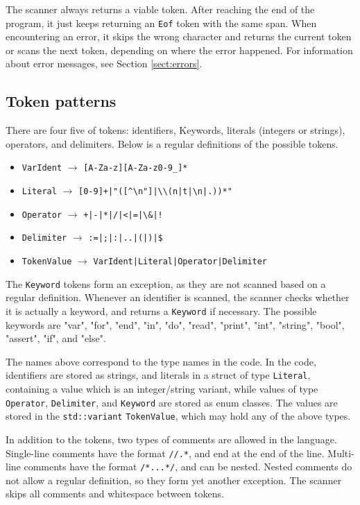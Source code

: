 \documentclass[a4paper]{article}
\newcommand*{\code}[1]{\texttt{#1}}
\begin{document}
The scanner always returns a viable token. After reaching the 
end of the program, it just keeps returning an \code{Eof} token 
with the same span. When encountering an error, it skips the 
wrong character and returns the current token or scans the next token, 
depending on where the error happened. For information about 
error messages, see Section \ref{sect:errors}.


\subsection{Token patterns}

There are four five of tokens: identifiers, Keywords, 
literals (integers or strings), operators, and delimiters.
Below is a regular definitions of the possible tokens. 
\begin{itemize}
  \item[] \code{VarIdent} $\rightarrow$ \verb?[A-Za-z][A-Za-z0-9_]*?
  \item[] \code{Literal} $\rightarrow$ \verb_[0-9]+|"([^\n"]|\\(n|t|\n|.))*"_
  \item[] \code{Operator} $\rightarrow$ \verb_+|-|*|/|<|=|\&|!_
  \item[] \code{Delimiter} $\rightarrow$ \verb_:=|;|:|..|(|)|$_
  \item[] \code{TokenValue} $\rightarrow$ \verb_VarIdent|Literal|Operator|Delimiter_
\end{itemize}
The \code{Keyword} tokens form an exception, as they are not scanned 
based on a regular definition. Whenever an identifier is scanned, 
the scanner checks whether it is actually a keyword, and returns 
a \code{Keyword} if necessary.
The possible keywords are  "var", "for", "end", "in", "do", "read", "print", 
"int", "string", "bool", "assert", "if", and "else".

The names above correspond to the type names in the code.  
In the code, identifiers are stored as strings, and literals in a 
struct of type \code{Literal}, containing a value which is 
an integer/string variant, while
values of type \code{Operator}, \code{Delimiter}, and \code{Keyword} 
are stored as enum classes.
The values are stored in the \code{std::variant}
\code{TokenValue}, which may hold any of the above types. 

In addition to the tokens, two types of comments are allowed in 
the language. Single-line comments have the format \verb_//.*_, 
and end at the end of the line. Multi-line comments have the format
\verb_/*...*/_, and can be nested. Nested comments do not allow 
a regular definition, so they form yet another exception. The 
scanner skips all comments and whitespace between tokens.
\end{document}

